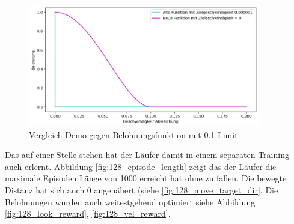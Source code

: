\begin{figure}[H]
  \centering  
  \includegraphics[width=0.9\textwidth]{img/match_velocity_vergleich_clip}
  \caption{Vergleich Demo gegen Belohnungsfunktion mit 0.1 Limit}
  \label{fig:match_velocity_vergleich_clip}
\end{figure}
Das auf einer Stelle stehen hat der Läufer damit in einem separaten Training auch erlernt. Abbildung \ref{fig:128_episode_length} zeigt das der Läufer die maximale Episoden Länge von 1000 erreicht hat ohne zu fallen. Die bewegte Distanz hat sich auch 0 angenähert (siehe \ref{fig:128_move_target_dir}. Die Belohnungen wurden auch weitestgehend optimiert siehe Abbildung \ref{fig:128_look_reward}, \ref{fig:128_vel_reward}.


